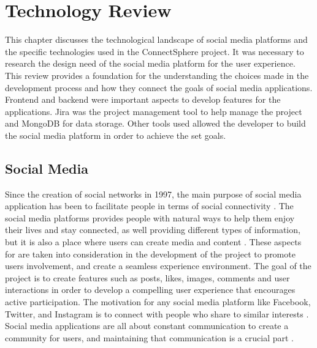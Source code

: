 \chapter{Technology Review}
This chapter discusses the technological landscape of social media platforms and the specific technologies used in the ConnectSphere project. It was necessary to research the design need of the social media platform for the user experience. This review provides a foundation for the understanding the choices made in the development process and how they connect the goals of social media applications. Frontend and backend were important aspects to develop features for the applications. Jira was the project management tool to help manage the project and MongoDB for data storage. Other tools used allowed the developer to build the social media platform in order to achieve the set goals.

\section{Social Media}
Since the creation of social networks in 1997, the main purpose of social media application has been to facilitate people in terms of social connectivity \cite{shabbir2016impact}. The social media platforms provides people with natural ways to help them enjoy their lives and stay connected, as well providing different types of information, but it is 
 also a place where users can create media and content \cite{shabbir2016impact}. These aspects for are taken into consideration in the development of the project to promote users involvement, and create a seamless experience environment. The goal of the project is to create features such as posts, likes, images, comments and user interactions in order to develop a compelling user experience that encourages active participation. The motivation for any social media platform like Facebook, Twitter, and Instagram is to connect with people who share to similar interests \cite{shabbir2016impact}. Social media applications are all about constant communication to create a community for users, and maintaining that communication is a crucial part \cite{jain2014application}. 

